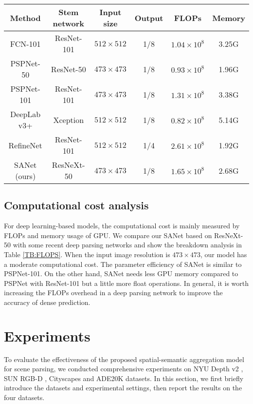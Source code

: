 \documentclass[10pt,twocolumn,twoside]{IEEEtran}
\begin{document}
\begin{table*}[t!]
\centering 
\caption{Computaional complexity analysis.}
\label{TB:FLOPS}
\begin{tabular}{|c||c|c|c|c|c|}
\hline
{\bf Method}	& {\bf Stem network}	& {\bf Input size}	& {\bf Output} 	& {\bf FLOPs} & {\bf Memory}\\
\hline
FCN-101    & ResNet-101  & $512\times512$ & 1/8	& $1.04\times10^8$ &   3.25G \\
PSPNet-50 \cite{CVPR17:PSPNET}   & ResNet-50  & $473\times473$  & 1/8	& $0.93\times10^8$  & 1.96G  \\
PSPNet-101 \cite{CVPR17:PSPNET}    & ResNet-101  & $473\times473$   & 1/8	& $1.31\times10^8$ & 3.38G  \\
DeepLab v3+ \cite{TPAMI:DEEPLAB}	& Xception  & $512\times512$   & 1/8	& $0.82\times10^8$  & 5.14G  \\
RefineNet \cite{CVPR17:REFINENET}	& ResNet-101  & $512\times512$ & 1/4	& $2.61\times10^8$ & 1.92G  \\
SANet (ours)	& ResNeXt-50	& $473\times473$ & 1/8	&$1.65\times10^8$    & 2.68G  \\
\hline
\end{tabular}
\end{table*}


\subsection{Computational cost analysis}
 
For deep learning-based models, the computational cost is mainly measured by FLOPs and memory usage of GPU. We compare our SANet based on ResNeXt-50 with some recent deep parsing networks and show the breakdown analysis in Table \ref{TB:FLOPS}. When the input image resolution is $473\times 473$, our model has a moderate computational cost. The parameter efficiency of SANet is similar to PSPNet-101. On the other hand, SANet needs less GPU memory compared to PSPNet with ResNet-101 but a little more float operations. In general, it is worth increasing the FLOPs overhead in a deep parsing network to improve the accuracy of dense prediction.

\section{Experiments}\label{SEC:EXP}

To evaluate the effectiveness of the proposed spatial-semantic aggregation model for scene parsing, we conducted comprehensive experiments on NYU Depth v2 \cite{ECCV12:NYU}, SUN RGB-D \cite{NIPS14:SUN}, Cityscapes \cite{CVPR16:CITYSCAPES} and ADE20K \cite{CVPR17:ADE20K} datasets. In this section, we first briefly introduce the datasets and experimental settings, then report the results on the four datasets.
\end{document}
